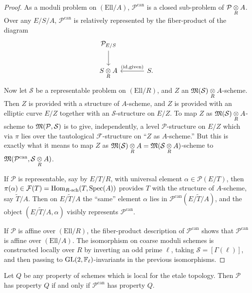 \begin{proof}
As a moduli problem on $(\mathrm{Ell}/A)$, $\mathcal{P}^{\mathrm{can}}$ is a closed sub-problem of $\mathcal{P} \underset{R}{\otimes} A$. Over any $E/S/A$, $\mathcal{P}^{\mathrm{can}}$ is relatively represented by the fiber-product of the diagram
\begin{equation*}
\begin{tikzcd}[row sep=2.2em, column sep=3.5em]
\mathcal{P}_{E/S} \arrow[d] & \\
S \tens{R} A & S \arrow[l, "{(\mathrm{id}, \text{given})}"'] .
\end{tikzcd}
\end{equation*}
Now let $\mathcal{S}$ be a representable problem on $(\mathrm{Ell}/R)$, and $Z$ an $\mathfrak{M}(\mathcal{S}) \underset{R}{\otimes} A$-scheme. Then $Z$ is provided with a structure of $A$-scheme, and $Z$ is provided with an elliptic curve $E/Z$ together with an $\mathcal{S}$-structure on $E/Z$. To map $Z$ as $\mathfrak{M}(\mathcal{S}) \underset{R}{\otimes} A$-scheme to $\mathfrak{M}(\mathcal{P}, \mathcal{S})$ is to give, independently, a level $\mathcal{P}$-structure on $E/Z$ which via $\pi$ lies over the tautological $\mathcal{F}$-structure on ``$Z$ as $A$-scheme.'' But this is exactly what it means to map $Z$ as $\mathfrak{M}(\mathcal{S}) \underset{R}{\otimes} A = \mathfrak{M}(\mathcal{S} \underset{R}{\otimes} A)$-scheme to $\mathfrak{M}(\mathcal{P}^{\mathrm{can}}, \mathcal{S} \underset{R}{\otimes} A)$.

If $\mathcal{P}$ is representable, say by $E/T/R$, with universal element $\alpha \in \mathcal{P}(E/T)$, then $\pi(\alpha) \in \mathcal{F}(T) = \operatorname{Hom}_{R\text{-sch}}(T, \operatorname{Spec}(A))$ provides $T$ with the structure of $A$-scheme, say $\widetilde{T}/A$. Then on $E/\widetilde{T}/A$ the ``same'' element $\alpha$ lies in $\mathcal{P}^{\mathrm{can}}(E/\widetilde{T}/A)$, and the object $(E/\widetilde{T}/A, \alpha)$ visibly represents $\mathcal{P}^{\mathrm{can}}$.

If $\mathcal{P}$ is affine over $(\mathrm{Ell}/R)$, the fiber-product description of $\mathcal{P}^{\mathrm{can}}$ shows that $\mathcal{P}^{\mathrm{can}}$ is affine over $(\mathrm{Ell}/A)$. The isomorphism on coarse moduli schemes is constructed locally over $R$ by inverting an odd prime $\ell$, taking $\mathcal{S} = [\Gamma(\ell)]$, and then passing to $\operatorname{GL}(2, \mathbb{F}_\ell)$-invariants in the previous isomorphisms.
\end{proof}

\begin{kcor}\label{cor:9.1.8}
Let $Q$ be any property of schemes which is local for the etale topology. Then $\mathcal{P}$ has property $Q$ if and only if $\mathcal{P}^{\mathrm{can}}$ has property $Q$.
\end{kcor}

